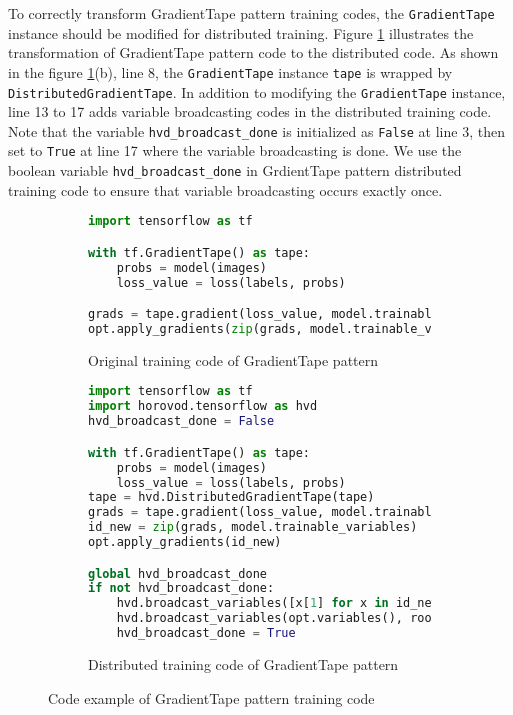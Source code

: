 To correctly transform GradientTape pattern training codes,
the {\tt GradientTape} instance should be modified for distributed training.
Figure \ref{fig:trans:gtapetrans} illustrates the transformation of
GradientTape pattern code to the distributed code.
As shown in the figure \ref{fig:trans:gtapetrans}(b), line 8,
the {\tt GradientTape} instance {\tt tape}
is wrapped by {\tt DistributedGradientTape}.
In addition to modifying the {\tt GradientTape} instance,
line 13 to 17 adds variable broadcasting codes in the distributed training
code. Note that the variable {\tt hvd\_broadcast\_done} is initialized as 
{\tt False} at line 3, 
then set to {\tt True} at line 17 where the variable broadcasting is done. 
We use the boolean variable {\tt hvd\_broadcast\_done} in GrdientTape pattern
distributed training code to ensure that variable broadcasting occurs exactly
once.

\begin{figure}[ht!]
  \centering
  \begin{subfigure}[t]{0.45\textwidth}
    \begin{lstlisting}[language=Python]
import tensorflow as tf

with tf.GradientTape() as tape:
    probs = model(images)
    loss_value = loss(labels, probs)

grads = tape.gradient(loss_value, model.trainable_variables)
opt.apply_gradients(zip(grads, model.trainable_variables))
    \end{lstlisting}
    \caption{Original training code of GradientTape pattern}
  \end{subfigure}
  \hspace{5mm}
  \begin{subfigure}[t]{0.45\textwidth}
    \begin{lstlisting}[language=Python]
import tensorflow as tf
import horovod.tensorflow as hvd
hvd_broadcast_done = False

with tf.GradientTape() as tape:
    probs = model(images)
    loss_value = loss(labels, probs)
tape = hvd.DistributedGradientTape(tape)
grads = tape.gradient(loss_value, model.trainable_variables)
id_new = zip(grads, model.trainable_variables)
opt.apply_gradients(id_new)

global hvd_broadcast_done
if not hvd_broadcast_done:
    hvd.broadcast_variables([x[1] for x in id_new], root_rank=0, )
    hvd.broadcast_variables(opt.variables(), root_rank=0, )
    hvd_broadcast_done = True
    \end{lstlisting}
    \caption{Distributed training code of GradientTape pattern}
  \end{subfigure}
  \caption{Code example of GradientTape pattern training code}
  \label{fig:trans:gtapetrans}
\end{figure}

